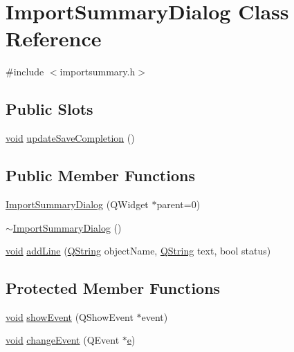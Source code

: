 \hypertarget{class_import_summary_dialog}{\section{\-Import\-Summary\-Dialog \-Class \-Reference}
\label{class_import_summary_dialog}
}


{\ttfamily \#include $<$importsummary.\-h$>$}

\subsection*{\-Public \-Slots}
\begin{DoxyCompactItemize}
\item 
\hyperlink{group___u_a_v_objects_plugin_ga444cf2ff3f0ecbe028adce838d373f5c}{void} \hyperlink{group___u_a_v_settings_import_export_gaf0532662634d23c11f3812ece8a170bb}{update\-Save\-Completion} ()
\end{DoxyCompactItemize}
\subsection*{\-Public \-Member \-Functions}
\begin{DoxyCompactItemize}
\item 
\hyperlink{group___u_a_v_settings_import_export_ga715ec099ff29a7acc3887e20f22219da}{\-Import\-Summary\-Dialog} (\-Q\-Widget $\ast$parent=0)
\item 
\hyperlink{group___u_a_v_settings_import_export_gaf410b79676dfd8f6636650a3d9ef48e2}{$\sim$\-Import\-Summary\-Dialog} ()
\item 
\hyperlink{group___u_a_v_objects_plugin_ga444cf2ff3f0ecbe028adce838d373f5c}{void} \hyperlink{group___u_a_v_settings_import_export_ga16fa18af8950ac368ac63851b4c8e409}{add\-Line} (\hyperlink{group___u_a_v_objects_plugin_gab9d252f49c333c94a72f97ce3105a32d}{\-Q\-String} object\-Name, \hyperlink{group___u_a_v_objects_plugin_gab9d252f49c333c94a72f97ce3105a32d}{\-Q\-String} text, bool status)
\end{DoxyCompactItemize}
\subsection*{\-Protected \-Member \-Functions}
\begin{DoxyCompactItemize}
\item 
\hyperlink{group___u_a_v_objects_plugin_ga444cf2ff3f0ecbe028adce838d373f5c}{void} \hyperlink{group___u_a_v_settings_import_export_gad8e0a82289892d886b2e350ea7dd1faf}{show\-Event} (\-Q\-Show\-Event $\ast$event)
\item 
\hyperlink{group___u_a_v_objects_plugin_ga444cf2ff3f0ecbe028adce838d373f5c}{void} \hyperlink{group___u_a_v_settings_import_export_ga31da7a0667d03f1e71cd5012bee5b544}{change\-Event} (\-Q\-Event $\ast$\hyperlink{_o_p_plots_8m_a9425be9aab51621e317ba7ade564b570}{e})
\end{DoxyCompactItemize}


